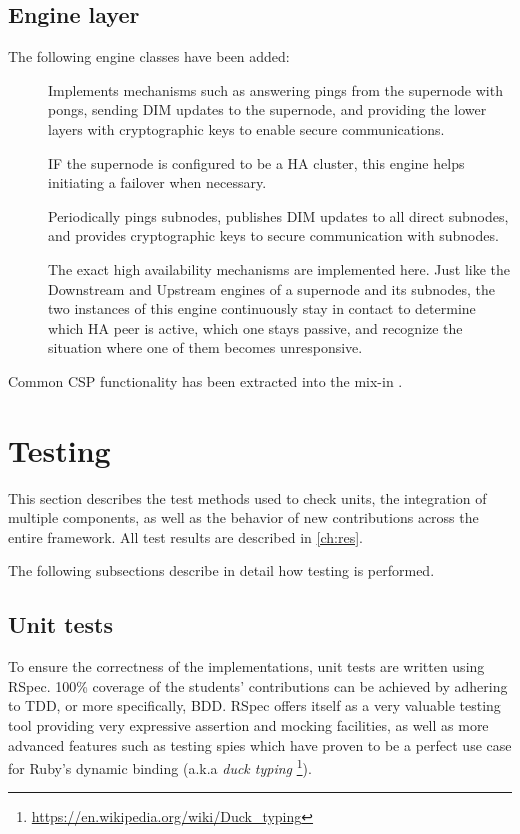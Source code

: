 \subsection{Engine layer}
The following engine classes have been added:
\begin{description}
	\item []
		Implements mechanisms such as answering pings from the
		supernode with pongs, sending DIM updates to the supernode, and
		providing the lower layers with cryptographic keys to enable
		secure communications.

		IF the supernode is configured to be a \gls{HA} cluster,
		this engine helps initiating a failover when necessary.

	\item []
		Periodically pings subnodes, publishes DIM updates to all
		direct subnodes, and provides cryptographic keys to secure
		communication with subnodes.


	\item []
		The exact high availability mechanisms are implemented here.
		Just like the Downstream and Upstream engines of a supernode
		and its subnodes, the two instances of this engine continuously
		stay in contact to determine which HA peer is active, which one
		stays passive, and recognize the situation where one of them
		becomes unresponsive.
\end{description}

Common CSP functionality has been extracted into the mix-in .



\section{Testing}
This section describes the test methods used to check units, the integration of
multiple components, as well as the behavior of new contributions across the
entire framework.  All test results are described in \autoref{ch:res}.

The following subsections describe in detail how testing is performed.

\subsection{Unit tests}
To ensure the correctness of the implementations, unit tests are written using
RSpec. 100\% coverage of the students' contributions can be achieved by
adhering to \gls{TDD}, or more specifically, \gls{BDD}. RSpec offers itself as
a very valuable testing tool providing very expressive assertion and mocking
facilities, as well as more advanced features such as testing spies which have
proven to be a perfect use case for Ruby's dynamic binding (a.k.a \emph{duck typing}
\footnote{\url{https://en.wikipedia.org/wiki/Duck_typing}}).


